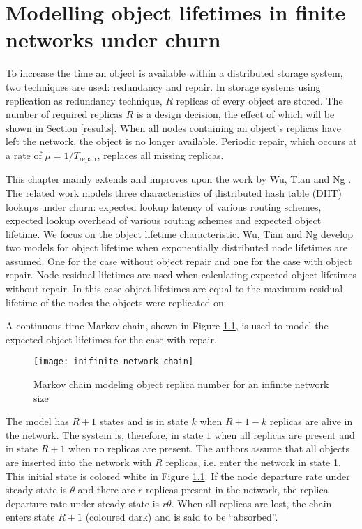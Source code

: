 \chapter{Modelling object lifetimes in finite networks under churn}
\label{chp:MODELLING}

To increase the time an object is available within a distributed storage system, two techniques are used: redundancy and repair. In storage systems using replication as redundancy technique, $R$ replicas of every object are stored. The number of required replicas $R$ is a design decision, the effect of which will be shown in Section \ref{results}. When all nodes containing an object's replicas have left the network, the object is no longer available. Periodic repair, which occurs at a rate of $\mu = 1/T_{\textrm{repair}}$, replaces all missing replicas.

This chapter mainly extends and improves upon the work by Wu, Tian and Ng \cite{replication_article}. The related work models three characteristics of distributed hash table (DHT) lookups under churn: expected lookup latency of various routing schemes, expected lookup overhead of various routing schemes and expected object lifetime. We focus on the object lifetime characteristic. Wu, Tian and Ng develop two models for object lifetime when exponentially distributed node lifetimes are assumed. One for the case without object repair and one for the case with object repair. Node residual lifetimes are used when calculating expected object lifetimes without repair. In this case object lifetimes are equal to the maximum residual lifetime of the nodes the objects were replicated on.


A continuous time Markov chain, shown in Figure \ref{fig_other_markov_chain}, is used to model the expected object lifetimes for the case with repair.
%
\begin{figure}[htbp]
 \centering
 \texttt{[image: inifinite\_network\_chain]}
 \caption{Markov chain modeling object replica number for an infinite network size}
 \label{fig_other_markov_chain}
\end{figure}
%
The model has $R+1$ states and is in state $k$ when $R+1-k$ replicas are alive in the network. The system is, therefore, in state $1$ when all replicas are present and in state $R+1$ when no replicas are present. The authors assume that all objects are inserted into the network with $R$ replicas, i.e. enter the network in state 1. This initial state is colored white in Figure \ref{fig_other_markov_chain}. If the node departure rate under steady state is $\theta$ and there are $r$ replicas present in the network, the replica departure rate under steady state is $r\theta$. When all replicas are lost, the chain enters state $R+1$ (coloured dark) and is said to be ``absorbed''.

